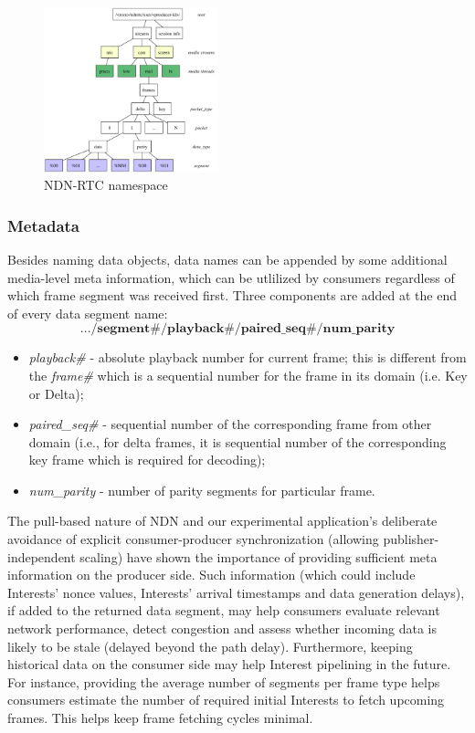 \documentclass{icn/sig-alternate-2012} %
\newcommand{\ndnrtcName}{NDN-RTC} %
\begin{document}
\begin{figure}[t!]
\centering
\includegraphics[width=0.45\textwidth]{namespace}
\caption{\ndnrtcName{} namespace}
\label{fig:namespace}
\end{figure}

\subsubsection{Metadata} 

Besides naming data objects, data names can be appended by some additional media-level meta information, which can be utlilized by consumers regardless of which frame segment was received first. Three components are added at the end of every data segment name:
\small\begin{equation}
.../\textbf{segment\#}/\textbf{playback\#}/\textbf{paired\_seq\#}/\textbf{num\_parity} \nonumber
\end{equation}\normalsize
\begin{itemize}[label={}]
\item \textit{playback\#} - absolute playback number for current frame; this is different from the \textit{frame\#} which is a sequential number for the frame in its domain (i.e. Key or Delta);
\item \textit{paired\_seq\#} - sequential number of the corresponding frame from other domain (i.e., for delta frames, it is sequential number of the corresponding key frame which is required for decoding);
\item \textit{num\_parity} - number of parity segments for particular frame.
\end{itemize}

The pull-based nature of NDN and our experimental application's deliberate avoidance of explicit consumer-producer synchronization (allowing publisher-independent scaling) have shown the importance of providing sufficient meta information on the producer side. Such information (which could include Interests' nonce values, Interests' arrival timestamps and data generation delays), if added to the returned data segment, may help consumers evaluate relevant network performance, detect congestion and assess whether incoming data is likely to be stale (delayed beyond the path delay). Furthermore, keeping historical data on the consumer side may help Interest pipelining in the future. For instance, providing the average number of segments per frame type helps consumers estimate the number of required initial Interests to fetch upcoming frames. This helps keep frame fetching cycles minimal.
\end{document}

